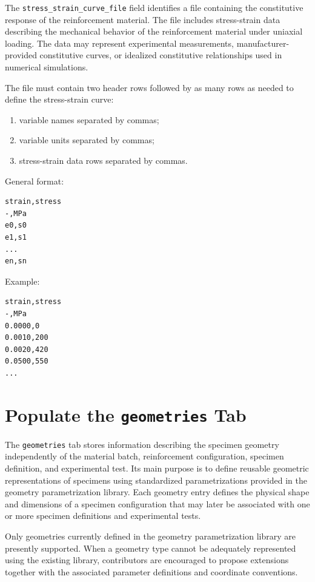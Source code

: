 \documentclass[11pt]{book}
\begin{document}
The \texttt{stress\_strain\_curve\_file} field identifies a file containing the constitutive response of the reinforcement material. The file includes stress-strain data describing the mechanical behavior of the reinforcement material under uniaxial loading. The data may represent experimental measurements, manufacturer-provided constitutive curves, or idealized constitutive relationships used in numerical simulations.

The file must contain two header rows followed by as many rows as needed to define the stress-strain curve:

\begin{enumerate}
    \item variable names separated by commas;
    \item variable units separated by commas;
    \item stress-strain data rows separated by commas.
\end{enumerate}

General format:

\begin{verbatim}
strain,stress
-,MPa
e0,s0
e1,s1
...
en,sn
\end{verbatim}

Example:

\begin{verbatim}
strain,stress
-,MPa
0.0000,0
0.0010,200
0.0020,420
0.0500,550
...
\end{verbatim}




\section{Populate the \texttt{geometries} Tab}

The \texttt{geometries} tab stores information describing the specimen geometry independently of the material batch, reinforcement configuration, specimen definition, and experimental test. Its main purpose is to define reusable geometric representations of specimens using standardized parametrizations provided in the geometry parametrization library. Each geometry entry defines the physical shape and dimensions of a specimen configuration that may later be associated with one or more specimen definitions and experimental tests.

Only geometries currently defined in the geometry parametrization library are presently supported. When a geometry type cannot be adequately represented using the existing library, contributors are encouraged to propose extensions together with the associated parameter definitions and coordinate conventions.
\end{document}
